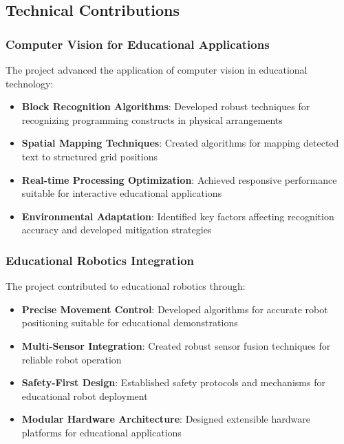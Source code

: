 \subsection{Technical Contributions}

\subsubsection{Computer Vision for Educational Applications}

The project advanced the application of computer vision in educational technology:

\begin{itemize}
    \item \textbf{Block Recognition Algorithms}: Developed robust techniques for recognizing programming constructs in physical arrangements
    \item \textbf{Spatial Mapping Techniques}: Created algorithms for mapping detected text to structured grid positions
    \item \textbf{Real-time Processing Optimization}: Achieved responsive performance suitable for interactive educational applications
    \item \textbf{Environmental Adaptation}: Identified key factors affecting recognition accuracy and developed mitigation strategies
\end{itemize}

\subsubsection{Educational Robotics Integration}

The project contributed to educational robotics through:

\begin{itemize}
    \item \textbf{Precise Movement Control}: Developed algorithms for accurate robot positioning suitable for educational demonstrations
    \item \textbf{Multi-Sensor Integration}: Created robust sensor fusion techniques for reliable robot operation
    \item \textbf{Safety-First Design}: Established safety protocols and mechanisms for educational robot deployment
    \item \textbf{Modular Hardware Architecture}: Designed extensible hardware platforms for educational applications
\end{itemize}

